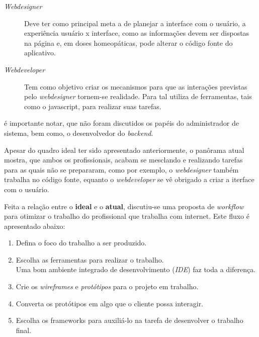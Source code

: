 \documentclass[a4paper]{report}
\begin{document}
        \begin{description}

            \item[\emph{Webdesigner}] Deve ter como principal meta a de planejar
            a interface com o usuário, a experiência usuário x
            interface, como as informações devem ser dispostas na
            página e, em doses homeopáticas, pode alterar o código
            fonte do aplicativo.

            \item[\emph{Webdeveloper}] Tem como objetivo criar os mecanismos para
            que as interações previstas pelo \emph{webdesigner} tornem-se
            realidade. Para tal utiliza de ferramentas, tais como o javascript,
            para realizar suas tarefas.

        \end{description}

        é importante notar, que não foram discutidos os papéis do
        administrador de sistema, bem como, o desenvolvedor do \emph{backend}.

        Apesar do quadro ideal ter sido apresentado anteriormente, o pan\^{o}rama
        atual mostra, que ambos os profissionais, acabam se mesclando e
        realizando tarefas para as quais não se prepararam, como por exemplo,
        o \emph{webdesigner} também trabalha no código fonte, equanto o
        \emph{webdeveloper} se vê obrigado a criar a iterface com o
        usuário.

        Feita a relação entre o \textbf{ideal} e o \textbf{atual},
        discutiu-se uma proposta de \emph{workflow} para otimizar o trabalho do
        profissional que trabalha com internet. Este fluxo é apresentado
        abaixo:

        \begin{enumerate}

            \item Defina o foco do trabalho a ser produzido.

            \item Escolha as ferramentas para realizar o trabalho.
                \\Uma bom ambiente integrado de desenvolvimento (\emph{IDE})
                faz toda a diferença.

            \item Crie os \emph{wireframes} e \emph{protótipos} para o
            projeto em trabalho.

            \item Converta os protótipos em algo que o cliente possa
            interagir.

            \item Escolha os frameworks para auxiliá-lo na tarefa de
            desenvolver o trabalho final.

        \end{enumerate}
\end{document}
